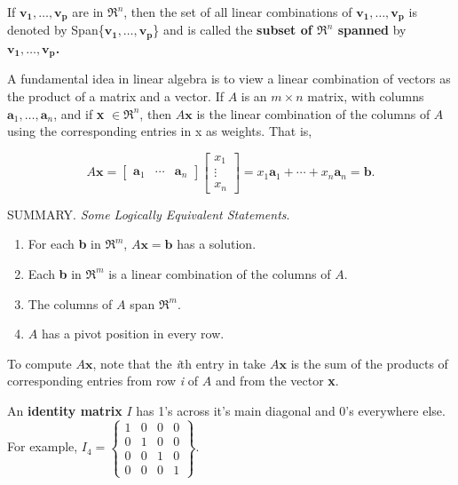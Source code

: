 \documentclass{article}
\begin{document}
\hfill \newline If $\mathbf{v_1},\dots,\mathbf{v_p}$ are in $\Re^n$, then the set of all linear combinations of $\mathbf{v_1},\dots,\mathbf{v_p}$ is denoted by Span\{$\mathbf{v_1},\dots,\mathbf{v_p}$\} and is called the \textbf{subset of $\Re^n$ spanned} by \textbf{$\mathbf{v_1},\dots,\mathbf{v_p}$.}

\hfill \newline A fundamental idea in linear algebra is to view a linear combination of vectors as the product of a matrix and a vector. If $A$ is an $m \times n$ matrix, with columns $\textbf{a}_1,\dots,\textbf{a}_n$, and if \textbf{x} $\in \Re^n$, then $A\textbf{x}$ is the linear combination of the columns of $A$ using the corresponding entries in x as weights. That is, 

\begin{equation}
    A\textbf{x} = 
    \begin{bmatrix}
    \textbf{a}_1 & \cdots & \textbf{a}_n
    \end{bmatrix}
    \begin{bmatrix}
    x_1 \\
    \vdots \\
    x_n
    \end{bmatrix}
    = x_1\textbf{a}_1 + \cdots + x_n\textbf{a}_n = \textbf{b}.
\end{equation}

\hfill \newline SUMMARY. \textit{Some Logically Equivalent Statements}.
\begin{enumerate}
    \item For each \textbf{b} in $\Re^m$, $A\textbf{x}=\textbf{b}$ has a solution.
    \item Each \textbf{b} in $\Re^m$ is a linear combination of the columns of $A$.
    \item The columns of $A$ span $\Re^m$.
    \item $A$ has a pivot position in every row.
\end{enumerate}

\hfill \newline To compute $A\textbf{x}$, note that the \textit{i}th entry in take $A\textbf{x}$ is the sum of the products of corresponding entries from row \textit{i} of $A$ and from the vector \textbf{x}.

\hfill \newline An \textbf{identity matrix} $I$ has 1's across it's main diagonal and 0's everywhere else. For example, 
$I_4 = \begin{Bmatrix}
    1 & 0 & 0 & 0 \\ 
    0 & 1 & 0 & 0 \\
    0 & 0 & 1 & 0 \\
    0 & 0 & 0 & 1
 \end{Bmatrix}$.
\end{document}
